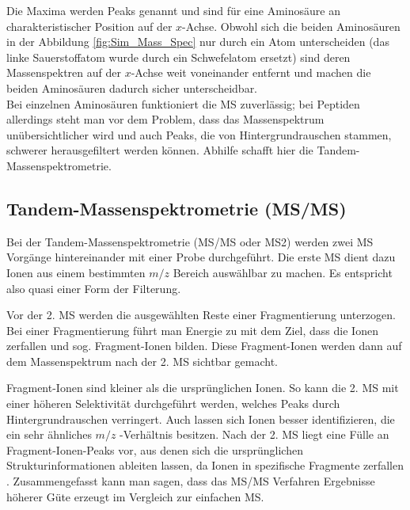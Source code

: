\documentclass[a4paper, 12pt]{article}
\newcommand{\gerquot}[1]{\glqq#1\grqq}
\newcommand{\massCharge}{$ m/z $ }
\begin{document}
Die Maxima werden \gerquot{Peaks} genannt und sind für eine Aminosäure an charakteristischer Position auf der $ x $-Achse. Obwohl sich die beiden Aminosäuren in der Abbildung \ref{fig:Sim_Mass_Spec} nur durch ein Atom unterscheiden (das linke Sauerstoffatom wurde durch ein Schwefelatom ersetzt) sind deren Massenspektren auf der $ x $-Achse weit voneinander entfernt und machen die beiden Aminosäuren dadurch sicher unterscheidbar.\\

Bei einzelnen Aminosäuren funktioniert die MS zuverlässig; bei Peptiden allerdings steht man vor dem Problem, dass das Massenspektrum unübersichtlicher wird und auch Peaks, die von Hintergrundrauschen stammen, schwerer herausgefiltert werden können. Abhilfe schafft hier die Tandem-Massenspektrometrie.

\subsection{Tandem-Massenspektrometrie (MS/MS)}\label{ss:Tandem_MS}
Bei der Tandem-Massenspektrometrie (MS/MS oder MS2) werden zwei MS Vorgänge hintereinander mit einer Probe durchgeführt. Die erste MS dient dazu Ionen aus einem bestimmten \massCharge Bereich auswählbar zu machen. Es entspricht also quasi einer Form der Filterung.

Vor der 2. MS werden die ausgewählten Reste einer Fragmentierung unterzogen. Bei einer Fragmentierung führt man Energie zu mit dem Ziel, dass die Ionen zerfallen und sog. Fragment-Ionen bilden. Diese Fragment-Ionen werden dann auf dem Massenspektrum nach der 2. MS sichtbar gemacht.

Fragment-Ionen sind kleiner als die ursprünglichen Ionen. So kann die 2. MS mit einer höheren Selektivität durchgeführt werden, welches Peaks durch Hintergrundrauschen verringert. Auch lassen sich Ionen besser identifizieren, die ein sehr ähnliches \massCharge-Verhältnis besitzen. Nach der 2. MS liegt eine Fülle an Fragment-Ionen-Peaks vor, aus denen sich die ursprünglichen Strukturinformationen ableiten lassen, da Ionen in spezifische Fragmente zerfallen \cite{Gross2013}. Zusammengefasst kann man sagen, dass das MS/MS Verfahren Ergebnisse höherer Güte erzeugt im Vergleich zur einfachen MS.
\end{document}
